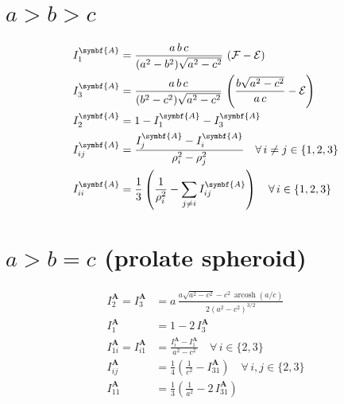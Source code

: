 \documentclass[
  a4paper,
  numbers=noendperiod,
  DIV=12]{scrreprt}
\newcommand{\uu}[1]{{\symbf{{#1}}}}
\DeclareMathOperator{\arcosh}{arcosh}
\begin{document}
\begin{tcolorbox}[enhanced jigsaw, arc=.35mm, bottomrule=.15mm, bottomtitle=1mm, breakable, colback=white, colbacktitle=quarto-callout-note-color!10!white, colframe=quarto-callout-note-color-frame, coltitle=black, left=2mm, leftrule=.75mm, opacityback=0, opacitybacktitle=0.6, rightrule=.15mm, title=\textcolor{quarto-callout-note-color}{\faInfo}\hspace{0.5em}{Generic expressions of \(I^{\uu{A}}_i\) and \(I^{\uu{A}}_{ij}\) (click
for details)}, titlerule=0mm, toprule=.15mm, toptitle=1mm]

\section{\texorpdfstring{\(a > b > c\)}{a \textgreater{} b \textgreater{} c}}

\begin{align}
I^{\uu{A}}_1&=\frac{a\,b\,c}{(a^2-b^2)\sqrt{a^2-c^2}}\,
\left({\cal F}-{\cal E}\right)\\
I^{\uu{A}}_3&=\frac{a\,b\,c}{(b^2-c^2)\sqrt{a^2-c^2}}\,
\left(\frac{b\sqrt{a^2-c^2}}{a\,c}-
{\cal E}\right)\\
I^{\uu{A}}_2&=1-I^{\uu{A}}_1-I^{\uu{A}}_3\\
I^{\uu{A}}_{ij}&=\frac{I^{\uu{A}}_j-I^{\uu{A}}_i}{\rho_i^2-\rho_j^2}\quad\forall\, i\neq j\in\{1,2,3\}\\
I^{\uu{A}}_{ii}&=\frac{1}{3}\left(
\frac{1}{\rho_i^2}-
\sum_{j\neq i}I^{\uu{A}}_{ij} \right) 
\quad\forall\, i\in\{1,2,3\}
\end{align}

\section{\texorpdfstring{\(a > b = c\) (prolate
spheroid)}{a \textgreater{} b = c (prolate spheroid)}}

\begin{align}
I^{\uu{A}}_2=I^{\uu{A}}_3&=a\,
\frac{a\sqrt{a^2-c^2}-c^2\,\arcosh{(a/c)}}
{2\left(a^2-c^2\right)^{3/2}}\\
I^{\uu{A}}_1&=1-2\,I^{\uu{A}}_3\\
I^{\uu{A}}_{1i}=I^{\uu{A}}_{i1}&=\frac{I^{\uu{A}}_i-I^{\uu{A}}_1}{a^2-c^2}\quad
\forall\, i\in\{2,3\}\\
I^{\uu{A}}_{ij}&=\frac{1}{4}
\left(\frac{1}{c^2}-I^{\uu{A}}_{31} \right) 
\quad\forall\, i,j\in\{2,3\}\\
I^{\uu{A}}_{11}&=\frac{1}{3}
\left(\frac{1}{a^2}-2\,I^{\uu{A}}_{31} \right)
\end{align}


\end{tcolorbox}
\end{document}
